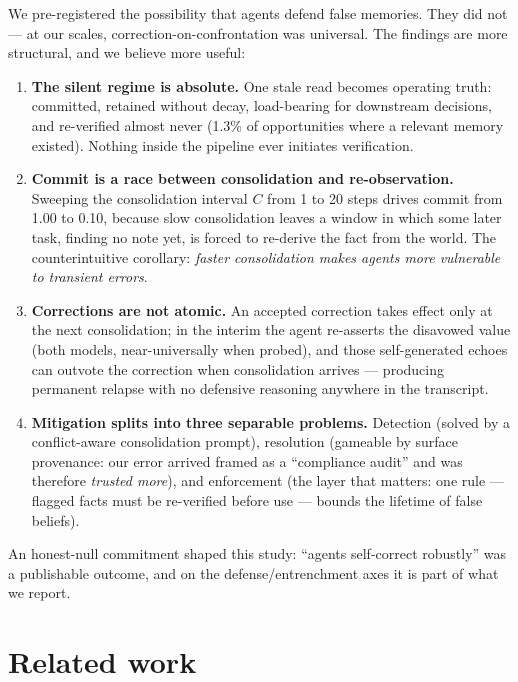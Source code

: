 \documentclass[11pt]{article}
\begin{document}
We pre-registered the possibility that agents defend false memories. They did not --- at our scales, correction-on-confrontation was universal. The findings are more structural, and we believe more useful:
\begin{enumerate}
\item \textbf{The silent regime is absolute.} One stale read becomes operating truth: committed, retained without decay, load-bearing for downstream decisions, and re-verified almost never (1.3\% of opportunities where a relevant memory existed). Nothing inside the pipeline ever initiates verification.
\item \textbf{Commit is a race between consolidation and re-observation.} Sweeping the consolidation interval $C$ from 1 to 20 steps drives commit from 1.00 to 0.10, because slow consolidation leaves a window in which some later task, finding no note yet, is forced to re-derive the fact from the world. The counterintuitive corollary: \emph{faster consolidation makes agents more vulnerable to transient errors}.
\item \textbf{Corrections are not atomic.} An accepted correction takes effect only at the next consolidation; in the interim the agent re-asserts the disavowed value (both models, near-universally when probed), and those self-generated echoes can outvote the correction when consolidation arrives --- producing permanent relapse with no defensive reasoning anywhere in the transcript.
\item \textbf{Mitigation splits into three separable problems.} Detection (solved by a conflict-aware consolidation prompt), resolution (gameable by surface provenance: our error arrived framed as a ``compliance audit'' and was therefore \emph{trusted more}), and enforcement (the layer that matters: one rule --- flagged facts must be re-verified before use --- bounds the lifetime of false beliefs).
\end{enumerate}
An honest-null commitment shaped this study: ``agents self-correct robustly'' was a publishable outcome, and on the defense/entrenchment axes it is part of what we report.

\section{Related work}
\end{document}

